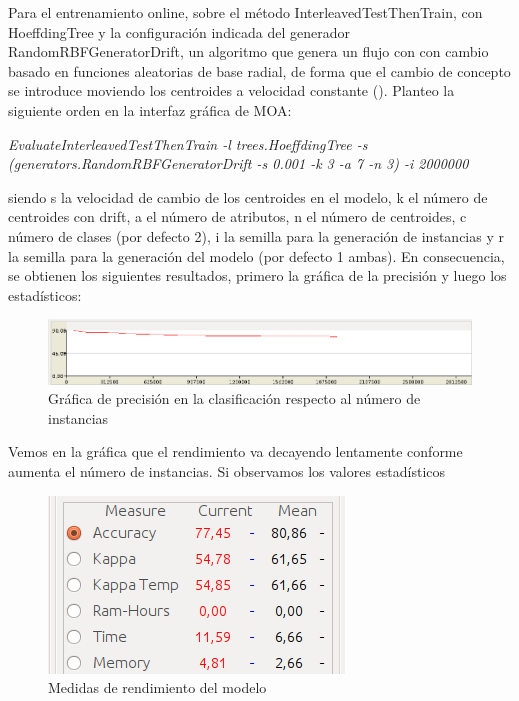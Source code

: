 Para el entrenamiento online, sobre el método InterleavedTestThenTrain, con HoeffdingTree y la configuración indicada del generador RandomRBFGeneratorDrift, un algoritmo que genera un flujo con con cambio basado en funciones aleatorias de base radial, de forma que el cambio de concepto se introduce moviendo los centroides a velocidad constante (\cite{moa-manual}). Planteo la siguiente orden en la interfaz gráfica de MOA:

\textit{EvaluateInterleavedTestThenTrain -l trees.HoeffdingTree -s (generators.RandomRBFGeneratorDrift -s 0.001 -k 3 -a 7 -n 3) -i 2000000}

siendo s la velocidad de cambio de los centroides en el modelo, k el número de centroides con drift, a el número de atributos, n el número de centroides, c número de clases (por defecto 2), i la semilla para la generación de instancias y r la semilla para la generación del modelo (por defecto 1 ambas). En consecuencia, se obtienen los siguientes resultados, primero la gráfica de la precisión y luego los estadísticos:

\begin{figure}[H] %
	\centering
	\includegraphics[scale=0.4]{cd1.png}  %
	\caption{Gráfica de precisión en la clasificación respecto al número de instancias} 
	\label{fig:cd1}
\end{figure}

Vemos en la gráfica que el rendimiento va decayendo lentamente conforme aumenta el número de instancias. Si observamos los valores estadísticos

\begin{figure}[H] %
	\centering
	\includegraphics[scale=0.5]{cd2.png}  %
	\caption{Medidas de rendimiento del modelo} 
	\label{fig:cd2}
\end{figure}

